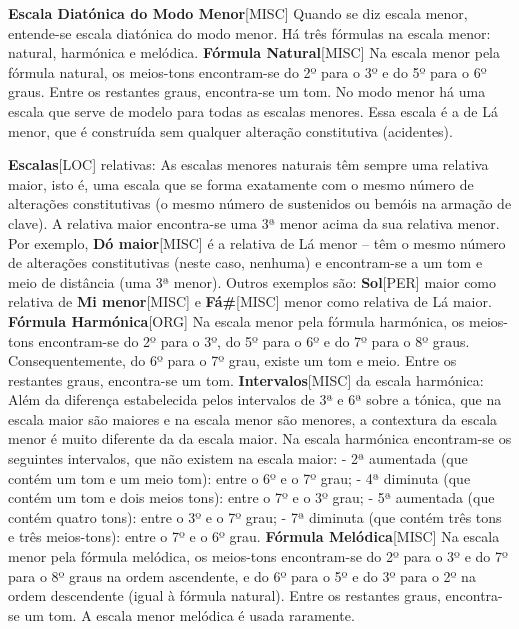 \documentclass[a4paper,12pt]{article}
\begin{document}
\textbf{Escala Diatónica do Modo Menor}\textsc{[MISC]} Quando se diz escala menor, entende-se escala diatónica do modo menor. Há três fórmulas na escala menor: natural, harmónica e melódica. \textbf{Fórmula Natural}\textsc{[MISC]} Na escala menor pela fórmula natural, os meios-tons encontram-se do 2º para o 3º e do 5º para o 6º graus. Entre os restantes graus, encontra-se um tom. No modo menor há uma escala que serve de modelo para todas as escalas menores. Essa escala é a de Lá menor, que é construída sem qualquer alteração constitutiva (acidentes).

\textbf{Escalas}\textsc{[LOC]} relativas: As escalas menores naturais têm sempre uma relativa maior, isto é, uma escala que se forma exatamente com o mesmo número de alterações constitutivas (o mesmo número de sustenidos ou bemóis na armação de clave). A relativa maior encontra-se uma 3ª menor acima da sua relativa menor. Por exemplo, \textbf{Dó maior}\textsc{[MISC]} é a relativa de Lá menor -- têm o mesmo número de alterações constitutivas (neste caso, nenhuma) e encontram-se a um tom e meio de distância (uma 3ª menor). Outros exemplos são: \textbf{Sol}\textsc{[PER]} maior como relativa de \textbf{Mi menor}\textsc{[MISC]} e \textbf{Fá\#}\textsc{[MISC]} menor como relativa de Lá maior. \textbf{Fórmula Harmónica}\textsc{[ORG]} Na escala menor pela fórmula harmónica, os meios-tons encontram-se do 2º para o 3º, do 5º para o 6º e do 7º para o 8º graus. Consequentemente, do 6º para o 7º grau, existe um tom e meio. Entre os restantes graus, encontra-se um tom. \textbf{Intervalos}\textsc{[MISC]} da escala harmónica: Além da diferença estabelecida pelos intervalos de 3ª e 6ª sobre a tónica, que na escala maior são maiores e na escala menor são menores, a contextura da escala menor é muito diferente da da escala maior. Na escala harmónica encontram-se os seguintes intervalos, que não existem na escala maior: - 2ª aumentada (que contém um tom e um meio tom): entre o 6º e o 7º grau; - 4ª diminuta (que contém um tom e dois meios tons): entre o 7º e o 3º grau; - 5ª aumentada (que contém quatro tons): entre o 3º e o 7º grau; - 7ª diminuta (que contém três tons e três meios-tons): entre o 7º e o 6º grau. \textbf{Fórmula Melódica}\textsc{[MISC]} Na escala menor pela fórmula melódica, os meios-tons encontram-se do 2º para o 3º e do 7º para o 8º graus na ordem ascendente, e do 6º para o 5º e do 3º para o 2º na ordem descendente (igual à fórmula natural). Entre os restantes graus, encontra-se um tom. A escala menor melódica é usada raramente.
\end{document}

